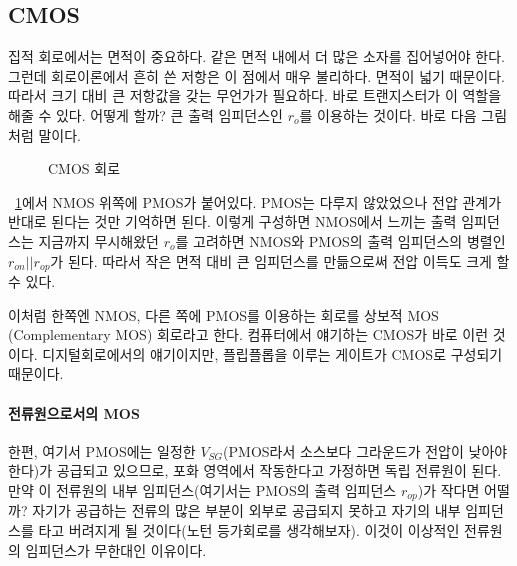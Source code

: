 \subsection{CMOS}
집적 회로에서는 면적이 중요하다. 같은 면적 내에서 더 많은 소자를 집어넣어야 한다. 그런데 회로이론에서 흔히 쓴 저항은 이 점에서 매우 불리하다. 면적이 넓기 때문이다. 따라서 크기 대비 큰 저항값을 갖는 무언가가 필요하다.
바로 트랜지스터가 이 역할을 해줄 수 있다. 어떻게 할까? 큰 출력 임피던스인 $r_o$를 이용하는 것이다. 바로 다음 그림처럼 말이다.
\begin{figure}[!tbp]
    \centering
    \caption{CMOS 회로}\label{fig:cmos}
\end{figure}
\figurename~\ref{fig:cmos}에서 NMOS 위쪽에 PMOS가 붙어있다. PMOS는 다루지 않았었으나 전압 관계가 반대로 된다는 것만 기억하면 된다.
이렇게 구성하면 NMOS에서 느끼는 출력 임피던스는 지금까지 무시해왔던 $r_o$를 고려하면 NMOS와 PMOS의 출력 임피던스의 병렬인 $r_{on}||r_{op}$가 된다. 따라서 작은 면적 대비 큰 임피던스를 만듦으로써 전압 이득도 크게 할 수 있다.

이처럼 한쪽엔 NMOS, 다른 쪽에 PMOS를 이용하는 회로를 상보적 MOS (Complementary MOS) 회로라고 한다. 컴퓨터에서 얘기하는 CMOS가 바로 이런 것이다. 디지털회로에서의 얘기이지만, 플립플롭을 이루는 게이트가 CMOS로 구성되기 때문이다.
\paragraph{전류원으로서의 MOS}
한편, 여기서 PMOS에는 일정한 $V_{SG}$(PMOS라서 소스보다 그라운드가 전압이 낮아야 한다)가 공급되고 있으므로, 포화 영역에서 작동한다고 가정하면 독립 전류원이 된다.
만약 이 전류원의 내부 임피던스(여기서는 PMOS의 출력 임피던스 $r_{op}$)가 작다면 어떨까? 자기가 공급하는 전류의 많은 부분이 외부로 공급되지 못하고 자기의 내부 임피던스를 타고 버려지게 될 것이다(노턴 등가회로를 생각해보자).
이것이 이상적인 전류원의 임피던스가 무한대인 이유이다.

